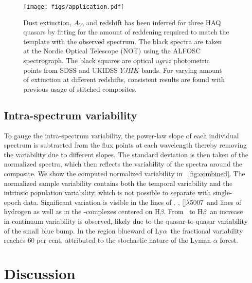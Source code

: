 \documentclass{aa}    %
\newcommand{\figref}[1]{\ref{fig:#1}}
\newcommand{\Fig}[1]{\figurename~\figref{#1}}
\newcommand{\fig}[1]{\Fig{#1}}
\newcommand{\figlabel}[1]{\label{fig:#1}}
\newcommand{\sectlabel}[1]{\label{sect:#1}}
\newcommand{\lya}{Ly$\alpha$}
\newcommand{\hb}{H$\beta$}
\newcommand{\oiii}{[\ion{O}{iii}]$\lambda$5007}
\newcommand{\feii}{\ion{Fe}{ii}}
\newcommand{\civ}{\ion{C}{iv}}
\newcommand{\mgii}{\ion{Mg}{ii}}
\begin{document}
\begin{figure}[t!]
 \centering
 \texttt{[image: figs/application.pdf]}
 \caption[]{Dust extinction, $A_V$, and redshift has been inferred
   for three HAQ quasars by fitting for the amount of reddening
   required to match the template with the observed spectrum. The
   black spectra are taken at the Nordic Optical Telescope (NOT) using
   the ALFOSC spectrograph. The black squares are optical $ugriz$
   photometric points from SDSS and UKIDSS $YJHK$
   bands. For varying amount of extinction at different redshifts,
   consistent results are found with previous usage of stitched
   composites.}  \figlabel{application}
\end{figure}
 
 \subsection{Intra-spectrum variability}  \sectlabel{variability}
 
To gauge the intra-spectrum variability, the power-law slope of each individual
spectrum is subtracted from the flux points at each wavelength thereby removing
the variability due to different slopes. The standard deviation is then taken of
the normalized spectra, which then reflects the variability of the spectra around
the composite. We show the computed
 normalized variability in \fig{combined}. The normalized sample variability
contains both the temporal variability and the intrinsic population variability,
which is not possible to separate with single-epoch data. 
Significant variation is visible in the lines of \civ,
\mgii, \oiii~and lines of hydrogen as well as in the \feii-complexes
centered on \hb. From \civ~to \hb~an increase in continuum
variability is observed, likely due to the quasar-to-quasar
variability of the small blue bump. In the region blueward of \lya~the fractional variability reaches 60 per cent, attributed to the
stochastic nature of the Lyman-$\alpha$ forest.


\section{Discussion}  \sectlabel{discuss}
\end{document}
